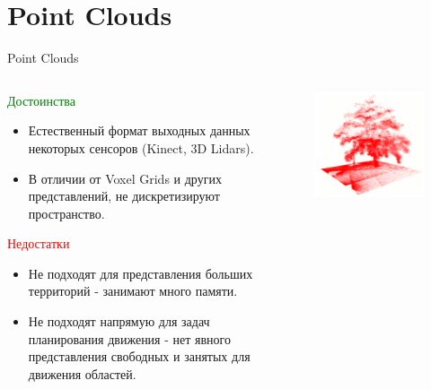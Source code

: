\documentclass[9pt]{beamer}
\begin{document}

\section{Point Clouds}

\begin{frame}{Point Clouds}
\begin{columns}
\begin{column}{0.60\textwidth}
  \begin{block}{\textcolor{green}{Достоинства}}
    \begin{itemize}
    \item
    { 
      Естественный формат выходных данных некоторых сенсоров (Kinect, 3D Lidars).
    }
    \item
    {
      В отличии от Voxel Grids и других представлений, не дискретизируют пространство.  
    }
    \end{itemize}
  \end{block}

  \begin{block}{\textcolor{red}{Недостатки}}
    \begin{itemize}
    \item
    { 
      Не подходят для представления больших территорий - занимают много памяти.
    }
    \item
    {
      Не подходят напрямую для задач планирования движения - нет явного представления свободных и занятых для движения областей.
    }
    \end{itemize}
  \end{block}
\end{column}
\begin{column}{0.40\textwidth}
  \begin{figure}[h]
      \centering
      \includegraphics[width=1.\textwidth]{point_cloud_tree.png}
  \end{figure}
\end{column}
\end{columns}
\end{frame}
\end{document}
